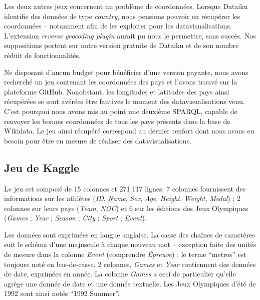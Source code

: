 \documentclass[hidelinks, 12pt]{report}
\begin{document}
Les deux autres jeux concernent un problème de coordonnées. Lorsque Dataiku identifie des données de type \textit{country}, nous pensions pouvoir en récupérer les coordonnées -- notamment afin de les exploiter pour les datavisualisations. L'extension \textit{reverse geocoding plugin} aurait pu nous le permettre, sans succès. Nos suppositions portent sur notre version gratuite de Dataiku et de son nombre réduit de fonctionnalités.

Ne disposant d'aucun budget pour bénéficier d'une version payante, nous avons recherché un jeu contenant les coordonnées des pays et l'avons trouvé sur la plateforme GitHub\autocite{github}. Nonobstant, les longitudes et latitudes des pays ainsi récupérées se sont avérées être fautives le moment des datavisualisations venu. C'est pourquoi nous avons mis au point une deuxième SPARQL, capable de renvoyer les bonnes coordonnées de tous les pays présents dans la base de Wikidata\autocite{wikiquerycoor}. Le jeu ainsi récupéré correspond au dernier renfort dont nous avons eu besoin pour être en mesure de réaliser des datavisualisations.





%





\subsection{Jeu de Kaggle}\label{kaggle}

Le jeu est composé de 15 colonnes et 271.117 lignes. 7 colonnes fournissent des informations sur les athlètes (\textit{ID}, \textit{Name}, \textit{Sex}, \textit{Age}, \textit{Height}, \textit{Weight}, \textit{Medal}) ; 2 colonnes sur leurs pays (\textit{Team}, \textit{NOC}) et 6 sur les éditions des Jeux Olympiques (\textit{Games} ; \textit{Year} ; \textit{Season} ; \textit{City} ; \textit{Sport} ; \textit{Event}).

Les données sont exprimées en langue anglaise. La casse des chaînes de caractères suit le schéma d'une majuscule à chaque nouveau mot -- exception faite des unités de mesure dans la colonne \textit{Event} (comprendre \textit{Épreuve}) : le terme \enquote{metres} est toujours noté en bas-de-casse. 2 colonnes, \textit{Games} et \textit{Year} contiennent des données de date, exprimées en année. La colonne \textit{Games} a ceci de particulier qu'elle agrège une donnée de date et une donnée textuelle. Les Jeux Olympiques d'été de 1992 sont ainsi notés \enquote{1992 Summer}.
\end{document}
